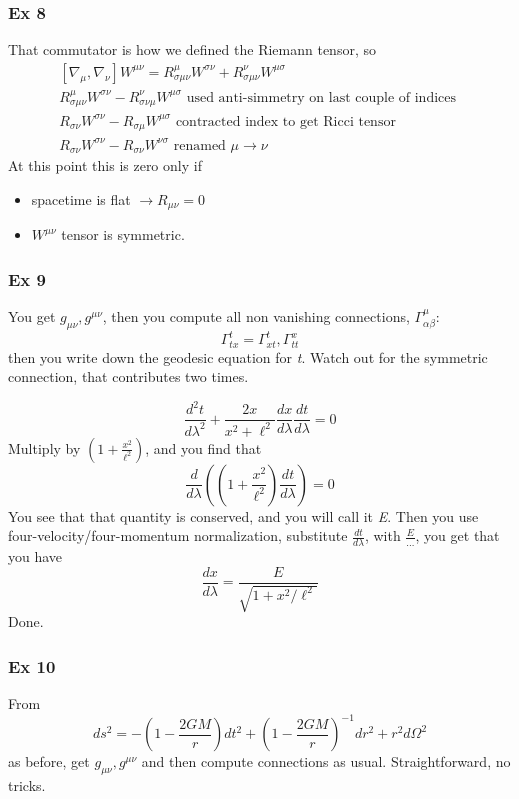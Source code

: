 \subsubsection{Ex 8}
That commutator is how we defined the Riemann tensor, so
\begin{gather*}
\left[ \nabla _{\mu }, \nabla _{\nu } \right]W^{\mu \nu } = R^{\mu }_{\sigma \mu \nu }W^{\sigma \nu } + R^{\nu }_{\sigma \mu \nu }W^{\mu \sigma }\\
R^{\mu }_{\sigma \mu \nu }W^{\sigma \nu } - R^{\nu }_{\sigma \nu \mu }W^{\mu \sigma } \text{ used anti-simmetry on last couple of indices }\\
R_{\sigma \nu }W^{\sigma \nu } - R_{\sigma \mu }W^{\mu \sigma } \text{ contracted index to get Ricci tensor }\\
R_{\sigma \nu }W^{\sigma \nu } - R_{\sigma \nu }W^{\nu \sigma } \text{ renamed $\mu\to \nu  $ }
\end{gather*}
At this point this is zero only if 
\begin{itemize}
\item  spacetime is flat $\to R_{\mu \nu }=0$
\item $W^{\mu \nu }$ tensor is symmetric.
\end{itemize}

\subsubsection{Ex 9}
You get $g_{\mu \nu }, g^{\mu \nu }$, then you compute all non vanishing connections, $\Gamma ^{\mu }_{\alpha \beta }$:
\[
\Gamma ^{t}_{tx }= \Gamma ^{t}_{xt}, \Gamma ^{x}_{tt}
\]
then you write down the geodesic equation for \emph{t}. Watch out for the symmetric connection, that contributes two times. \par
\[
	\frac{d ^{2}t}{d \lambda ^{2} } + \frac{2x}{x^{2}+\ell^{2}}\frac{d x}{d \lambda }\frac{d t}{d \lambda } = 0
\]
Multiply by $\left( 1 + \frac{x^{2}}{\ell^{2}} \right)$, and you find that
\[
\frac{d }{d \lambda }\left( \left(  1+ \frac{x^{2}}{\ell^{2}} \right) \frac{d t}{d \lambda } \right) = 0
\]
You see that that quantity is conserved, and you will call it \emph{E}. Then you use four-velocity/four-momentum normalization, substitute $\frac{d t}{d \lambda }$, with $\frac{E}{\ldots }$, you get that you have 
\[
\frac{d x}{d \lambda } = \frac{E}{\sqrt{1 + x^{2}/\ell^{2}}}
\]
Done.
\subsubsection{Ex 10}
From 
\[
ds^{2 } = -\left( 1- \frac{2GM}{r} \right)dt^{2} + \left( 1 - \frac{2GM}{r} \right)^{-1}dr^{2} + r^{2}d\Omega ^{2}
\]
as before, get $g_{\mu \nu }, g^{\mu \nu }$ and then compute connections as usual. Straightforward, no tricks.

